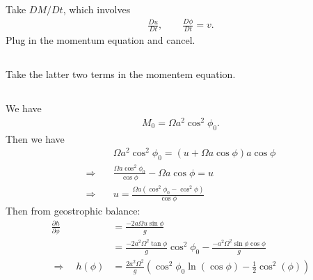 \documentclass[11pt,letterpaper]{book}
\theoremstyle{definition}
\newcommand{\pe}{\partial}
\newcommand{\dsp}{\displaystyle}
\newcommand{\thus}{\Rightarrow \quad }
\begin{document}
\subsection{}
Take $\dsp{DM/Dt}$, which involves
\begin{align*}
\frac{Du}{Dt},\qquad \frac{D\phi}{Dt} = v.
\end{align*}
Plug in the momentum equation and cancel.

\subsection{}
Take the latter two terms in the momentem equation.

\subsection{}
We have
\begin{align*}
M_0 = \Omega a^2\cos^2\phi_0.
\end{align*}
Then we have
\begin{align*}
&\Omega a^2\cos^2\phi_0 = (u+\Omega a\cos\phi)a\cos\phi\\
\thus &\frac{\Omega a\cos^2\phi_0}{\cos\phi}-\Omega a\cos\phi = u\\
\thus &u = \frac{\Omega a (\cos^2\phi_0-\cos^2\phi)}{\cos\phi}
\end{align*}
Then from geostrophic balance:
\begin{align*}
\frac{\pe h}{\pe\phi} &= \frac{-2a\Omega u\sin\phi}{g}\\
&= \frac{-2a^2\Omega^2 \tan\phi}{g} \cos^2\phi_0-\frac{-a^2\Omega^2 \sin\phi\cos\phi}{g}\\
\thus h(\phi) &= \frac{2a^2\Omega^2}{g} \left(\cos^2\phi_0\ln(\cos\phi) - \frac{1}{2}\cos^2(\phi)\right)
\end{align*}
\end{document}
